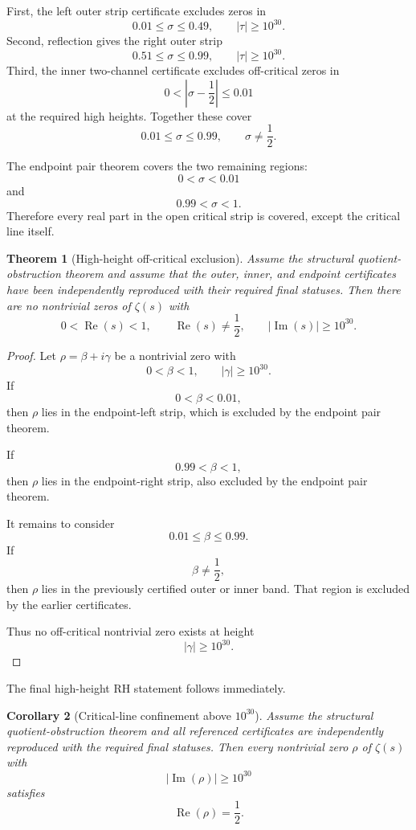 \documentclass[11pt]{article}
\newtheorem{theorem}{Theorem}[section]
\newtheorem{corollary}[theorem]{Corollary}
\DeclareMathOperator{\Rea}{Re}
\DeclareMathOperator{\Ima}{Im}
\begin{document}
First, the left outer strip certificate excludes zeros in
\[
0.01\leq \sigma\leq0.49,
\qquad
|\tau|\geq10^{30}.
\]
Second, reflection gives the right outer strip
\[
0.51\leq \sigma\leq0.99,
\qquad
|\tau|\geq10^{30}.
\]
Third, the inner two-channel certificate excludes off-critical zeros in
\[
0<\left|\sigma-\frac12\right|\leq0.01
\]
at the required high heights. Together these cover
\[
0.01\leq \sigma\leq0.99,
\qquad
\sigma\neq\frac12.
\]

The endpoint pair theorem covers the two remaining regions:
\[
0<\sigma<0.01
\]
and
\[
0.99<\sigma<1.
\]
Therefore every real part in the open critical strip is covered, except the critical line itself.

\begin{theorem}[High-height off-critical exclusion]
Assume the structural quotient-obstruction theorem and assume that the outer, inner, and endpoint certificates have been independently reproduced with their required final statuses. Then there are no nontrivial zeros of \(\zeta(s)\) with
\[
0<\Rea(s)<1,
\qquad
\Rea(s)\neq\frac12,
\qquad
|\Ima(s)|\geq10^{30}.
\]
\end{theorem}

\begin{proof}
Let \(\rho=\beta+i\gamma\) be a nontrivial zero with
\[
0<\beta<1,
\qquad
|\gamma|\geq10^{30}.
\]
If
\[
0<\beta<0.01,
\]
then \(\rho\) lies in the endpoint-left strip, which is excluded by the endpoint pair theorem.

If
\[
0.99<\beta<1,
\]
then \(\rho\) lies in the endpoint-right strip, also excluded by the endpoint pair theorem.

It remains to consider
\[
0.01\leq\beta\leq0.99.
\]
If
\[
\beta\neq\frac12,
\]
then \(\rho\) lies in the previously certified outer or inner band. That region is excluded by the earlier certificates.

Thus no off-critical nontrivial zero exists at height
\[
|\gamma|\geq10^{30}.
\]
\end{proof}

The final high-height RH statement follows immediately.

\begin{corollary}[Critical-line confinement above \(10^{30}\)]
Assume the structural quotient-obstruction theorem and all referenced certificates are independently reproduced with the required final statuses. Then every nontrivial zero \(\rho\) of \(\zeta(s)\) with
\[
|\Ima(\rho)|\geq10^{30}
\]
satisfies
\[
\Rea(\rho)=\frac12.
\]
\end{corollary}
\end{document}
